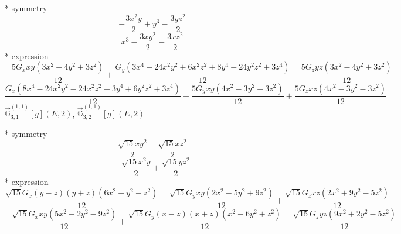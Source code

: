 \documentclass[fleqn,8pt]{jsarticle}
\begin{document}
\noindent\quad ** symmetry
\begin{dmath*}
- \frac{3 x^{2} y}{2} + y^{3} - \frac{3 y z^{2}}{2}
\end{dmath*}
\begin{dmath*}
x^{3} - \frac{3 x y^{2}}{2} - \frac{3 x z^{2}}{2}
\end{dmath*}
\noindent\quad ** expression
\begin{dmath*}
- \frac{5 G_{x} x y \left(3 x^{2} - 4 y^{2} + 3 z^{2}\right)}{12} + \frac{G_{y} \left(3 x^{4} - 24 x^{2} y^{2} + 6 x^{2} z^{2} + 8 y^{4} - 24 y^{2} z^{2} + 3 z^{4}\right)}{12} - \frac{5 G_{z} y z \left(3 x^{2} - 4 y^{2} + 3 z^{2}\right)}{12}
\end{dmath*}
\begin{dmath*}
\frac{G_{x} \left(8 x^{4} - 24 x^{2} y^{2} - 24 x^{2} z^{2} + 3 y^{4} + 6 y^{2} z^{2} + 3 z^{4}\right)}{12} + \frac{5 G_{y} x y \left(4 x^{2} - 3 y^{2} - 3 z^{2}\right)}{12} + \frac{5 G_{z} x z \left(4 x^{2} - 3 y^{2} - 3 z^{2}\right)}{12}
\end{dmath*}
\noindent\quad $\vec{\mathbb{G}}_{3,1}^{(1,1)}[g](E,2)$, $\vec{\mathbb{G}}_{3,2}^{(1,1)}[g](E,2)$

\noindent\quad ** symmetry
\begin{dmath*}
\frac{\sqrt{15} x y^{2}}{2} - \frac{\sqrt{15} x z^{2}}{2}
\end{dmath*}
\begin{dmath*}
- \frac{\sqrt{15} x^{2} y}{2} + \frac{\sqrt{15} y z^{2}}{2}
\end{dmath*}
\noindent\quad ** expression
\begin{dmath*}
\frac{\sqrt{15} G_{x} \left(y - z\right) \left(y + z\right) \left(6 x^{2} - y^{2} - z^{2}\right)}{12} - \frac{\sqrt{15} G_{y} x y \left(2 x^{2} - 5 y^{2} + 9 z^{2}\right)}{12} + \frac{\sqrt{15} G_{z} x z \left(2 x^{2} + 9 y^{2} - 5 z^{2}\right)}{12}
\end{dmath*}
\begin{dmath*}
- \frac{\sqrt{15} G_{x} x y \left(5 x^{2} - 2 y^{2} - 9 z^{2}\right)}{12} + \frac{\sqrt{15} G_{y} \left(x - z\right) \left(x + z\right) \left(x^{2} - 6 y^{2} + z^{2}\right)}{12} - \frac{\sqrt{15} G_{z} y z \left(9 x^{2} + 2 y^{2} - 5 z^{2}\right)}{12}
\end{dmath*}
\end{document}

